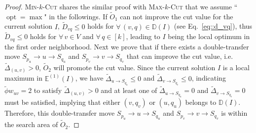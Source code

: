 \documentclass[10pt,a4paper]{amsart}
\DeclareMathOperator*{\opt}{\ensuremath{opt}}
\begin{document}
			\begin{proof}
				\textsc{Min}-$k$-\textsc{Cut} shares the similar proof with \textsc{Max}-$k$-\textsc{Cut} that we assume ``$\opt=\max$" in the followings.
				If $\widetilde{O}_1$ can not improve the cut value for the current solution $I$, $\widetilde{D}_{vq}\leq 0$ holds for $\forall\,(v,q)\in \mathbb{D}(I)$ (see Eq.~\eqref{eq::d_vq}), thus $\widetilde{D}_{vq}\leq 0$ holds for $\forall\,v\in V$ and $\forall\,q\in[k]$, leading to $I$ being the local optimum in the first order neighborhood. Next we prove that if there exists a double-transfer move $S_{p_u}\rightarrow u\rightarrow S_{q_u}$ and $S_{p_v}\rightarrow v \rightarrow S_{q_v}$ that can improve the cut value, i.e. $\widetilde{\Delta}_{(u,v)}>0$, $\widetilde{O}_2$ will promote the cut value. Since the current solution $I$ is a local maximum in $\mathbb{E}^{(1)}(I)$, we have $\widetilde{\Delta}_{u\rightarrow S_{q_u}}\leq 0$ and $\widetilde{\Delta}_{v\rightarrow S_{q_v}}\leq 0$, indicating $\widetilde{\phi}w_{uv}=2$ to satisfy $\widetilde{\Delta}_{(u,v)}>0$ and at least one of $\widetilde{\Delta}_{u\rightarrow S_{q_u}}=0$ and $\widetilde{\Delta}_{v\rightarrow S_{q_v}}=0$ must be satisfied, implying that either $(v,q_v)$ or $(u,q_u)$ belongs to $\mathbb{D}(I)$. Therefore, this double-transfer move $S_{p_u}\rightarrow u\rightarrow S_{q_u}$ and $S_{p_v}\rightarrow v \rightarrow S_{q_v}$ is within the search area of $\widetilde{O}_2$.
			\end{proof}
\end{document}
